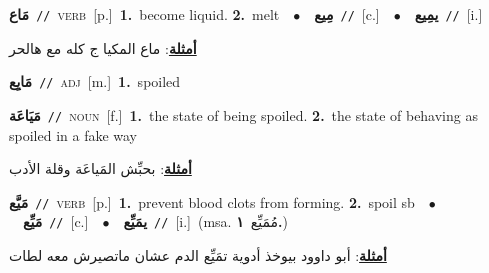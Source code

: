 \documentclass[10pt,a4paper,twoside]{article} %
\begin{document}
\begin{multicols}{2}
{\setlength\topsep{0pt}\textbf{\foreignlanguage{arabic}{مَاع}}\ {\color{gray}\texttt{//}\color{black}}\ \textsc{verb}\ [p.]\ \textbf{1.}~become liquid.  \textbf{2.}~melt\ \ $\bullet$\ \ \setlength\topsep{0pt}\textbf{\foreignlanguage{arabic}{مِيع}}\ {\color{gray}\texttt{//}\color{black}}\ [c.]\ \ $\bullet$\ \ \setlength\topsep{0pt}\textbf{\foreignlanguage{arabic}{يمِيع}}\ {\color{gray}\texttt{//}\color{black}}\ [i.]\  \begin{flushright}\color{gray}\foreignlanguage{arabic}{\textbf{\underline{\foreignlanguage{arabic}{أمثلة}}}: ماع المكيا ج كله مع هالحر}\end{flushright}\color{black}} \vspace{2mm}

{\setlength\topsep{0pt}\textbf{\foreignlanguage{arabic}{مَايِع}}\ {\color{gray}\texttt{//}\color{black}}\ \textsc{adj}\ [m.]\ \textbf{1.}~spoiled\ } \vspace{2mm}

{\setlength\topsep{0pt}\textbf{\foreignlanguage{arabic}{مَيَاعَة}}\ {\color{gray}\texttt{//}\color{black}}\ \textsc{noun}\ [f.]\ \textbf{1.}~the state of being spoiled.  \textbf{2.}~the state of behaving as spoiled in a fake way\  \begin{flushright}\color{gray}\foreignlanguage{arabic}{\textbf{\underline{\foreignlanguage{arabic}{أمثلة}}}: بحبِّش المَياعَة وقلة الأدب}\end{flushright}\color{black}} \vspace{2mm}

{\setlength\topsep{0pt}\textbf{\foreignlanguage{arabic}{مَيَّع}}\ {\color{gray}\texttt{//}\color{black}}\ \textsc{verb}\ [p.]\ \textbf{1.}~prevent blood clots from forming.  \textbf{2.}~spoil sb\ \ $\bullet$\ \ \setlength\topsep{0pt}\textbf{\foreignlanguage{arabic}{مَيِّع}}\ {\color{gray}\texttt{//}\color{black}}\ [c.]\ \ $\bullet$\ \ \setlength\topsep{0pt}\textbf{\foreignlanguage{arabic}{يمَيِّع}}\ {\color{gray}\texttt{//}\color{black}}\ [i.]\ \color{gray}(msa. \foreignlanguage{arabic}{مُمَيِّع}~\foreignlanguage{arabic}{\textbf{١.}})\color{black}\  \begin{flushright}\color{gray}\foreignlanguage{arabic}{\textbf{\underline{\foreignlanguage{arabic}{أمثلة}}}: أبو داوود بيوخذ أدوية تمَيِّع الدم عشان ماتصيرش معه لطات}\end{flushright}\color{black}} \vspace{2mm}


\end{multicols}
\end{document}
